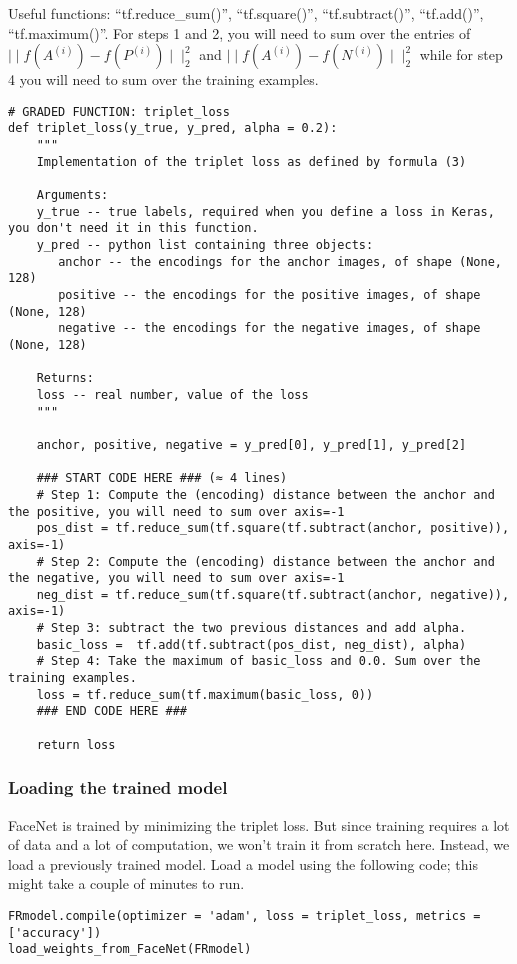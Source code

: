 Useful functions: ``tf.reduce\_sum()'', ``tf.square()'', ``tf.subtract()'', ``tf.add()'', ``tf.maximum()''.
For steps 1 and 2, you will need to sum over the entries of $\mid \mid f(A^{(i)}) - f(P^{(i)}) \mid \mid_2^2$ and $\mid \mid f(A^{(i)}) - f(N^{(i)}) \mid \mid_2^2$ while for step 4 you will need to sum over the training examples.
\begin{verbatim}
# GRADED FUNCTION: triplet_loss
def triplet_loss(y_true, y_pred, alpha = 0.2):
    """
    Implementation of the triplet loss as defined by formula (3)
    
    Arguments:
    y_true -- true labels, required when you define a loss in Keras, you don't need it in this function.
    y_pred -- python list containing three objects:
       anchor -- the encodings for the anchor images, of shape (None, 128)
       positive -- the encodings for the positive images, of shape (None, 128)
       negative -- the encodings for the negative images, of shape (None, 128)
    
    Returns:
    loss -- real number, value of the loss
    """
    
    anchor, positive, negative = y_pred[0], y_pred[1], y_pred[2]
    
    ### START CODE HERE ### (≈ 4 lines)
    # Step 1: Compute the (encoding) distance between the anchor and the positive, you will need to sum over axis=-1
    pos_dist = tf.reduce_sum(tf.square(tf.subtract(anchor, positive)), axis=-1)
    # Step 2: Compute the (encoding) distance between the anchor and the negative, you will need to sum over axis=-1
    neg_dist = tf.reduce_sum(tf.square(tf.subtract(anchor, negative)), axis=-1)
    # Step 3: subtract the two previous distances and add alpha.
    basic_loss =  tf.add(tf.subtract(pos_dist, neg_dist), alpha)
    # Step 4: Take the maximum of basic_loss and 0.0. Sum over the training examples.
    loss = tf.reduce_sum(tf.maximum(basic_loss, 0))
    ### END CODE HERE ###
    
    return loss
\end{verbatim}



\subsubsection{Loading the trained model}
FaceNet is trained by minimizing the triplet loss. But since training requires a lot of data and a lot of computation, we won't train it from scratch here. Instead, we load a previously trained model. Load a model using the following code; this might take a couple of minutes to run.
\begin{verbatim}
FRmodel.compile(optimizer = 'adam', loss = triplet_loss, metrics = ['accuracy'])
load_weights_from_FaceNet(FRmodel)
\end{verbatim}

